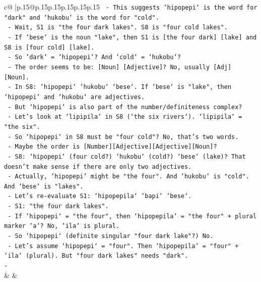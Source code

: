 \documentclass{article}
\begin{document}
{\begin{supertabular}{c@{$\;$}|p{.15\linewidth}@{}p{.15\linewidth}p{.15\linewidth}p{.15\linewidth}p{.15\linewidth}p{.15\linewidth}}
{{{\texttt{       {-} This suggests `hipopepi` is the word for "dark" and `hukobu` is the word for "cold".} \\
\texttt{       {-} Wait, S1 is "the four dark lakes". S8 is "four cold lakes".} \\
\texttt{       {-} If `bese` is the noun "lake", then S1 is {[}the four dark{]} {[}lake{]} and S8 is {[}four cold{]} {[}lake{]}.} \\
\texttt{       {-} So `dark` = `hipopepi`? And `cold` = `hukobu`?} \\
\texttt{       {-} The order seems to be: {[}Noun{]} {[}Adjective{]}? No, usually {[}Adj{]} {[}Noun{]}.} \\
\texttt{       {-} In S8: `hipopepi` `hukobu` `bese`. If `bese` is "lake", then `hipopepi` and `hukobu` are adjectives.} \\
\texttt{       {-} But `hipopepi` is also part of the number/definiteness complex?} \\
\texttt{       {-} Let's look at `lipipila` in S8 (`the six rivers`). `lipipila` = "the six".} \\
\texttt{       {-} So `hipopepi` in S8 must be "four cold"? No, that's two words.} \\
\texttt{       {-} Maybe the order is {[}Number{]}{[}Adjective{]}{[}Adjective{]}{[}Noun{]}?} \\
\texttt{       {-} S8: `hipopepi` (four cold?) `hukobu` (cold?) `bese` (lake)? That doesn't make sense if there are only two adjectives.} \\
\texttt{       {-} Actually, `hipopepi` might be "the four". And `hukobu` is "cold". And `bese` is "lakes".} \\
\texttt{       {-} Let's re{-}evaluate S1: `hipopepila` `bapi` `bese`.} \\
\texttt{         {-} S1: "the four dark lakes".} \\
\texttt{         {-} If `hipopepi` = "the four", then `hipopepila` = "the four" + plural marker `a`? No, `ila` is plural.} \\
\texttt{         {-} So `hipopepi` (definite singular "four dark lake"?) No.} \\
\texttt{         {-} Let's assume `hipopepi` = "four". Then `hipopepila` = "four" + `ila` (plural). But "four dark lakes" needs "dark".} \\
\texttt{         {-}} \\
            }
        }
    }
    & & \\ \\


\end{supertabular}}
\end{document}
